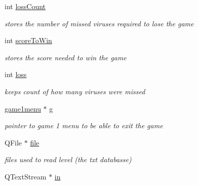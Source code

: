 \begin{DoxyCompactItemize}
\mbox{\label{classgame1scene_ade62ddcdc487fed3172557f475661207}} 
int \hyperlink{classgame1scene_ade62ddcdc487fed3172557f475661207}{loss\+Count}
\begin{DoxyCompactList}\small\item\em stores the number of missed viruses required to lose the game \end{DoxyCompactList}\item 
\mbox{\label{classgame1scene_a2ddd7dd6961d74ed938a9a924bf0063d}} 
int \hyperlink{classgame1scene_a2ddd7dd6961d74ed938a9a924bf0063d}{score\+To\+Win}
\begin{DoxyCompactList}\small\item\em stores the score needed to win the game \end{DoxyCompactList}\item 
\mbox{\label{classgame1scene_aab5556912872e7d31c72a911a7443244}} 
int \hyperlink{classgame1scene_aab5556912872e7d31c72a911a7443244}{loss}
\begin{DoxyCompactList}\small\item\em keeps count of how many viruses were missed \end{DoxyCompactList}\item 
\mbox{\label{classgame1scene_ad71ee5af83ebf44269c1985d300aa104}} 
\hyperlink{classgame1menu}{game1menu} $\ast$ \hyperlink{classgame1scene_ad71ee5af83ebf44269c1985d300aa104}{g}
\begin{DoxyCompactList}\small\item\em pointer to game 1 menu to be able to exit the game \end{DoxyCompactList}\item 
\mbox{\label{classgame1scene_a0b20d7d61cf85c7928d181d379744219}} 
Q\+File $\ast$ \hyperlink{classgame1scene_a0b20d7d61cf85c7928d181d379744219}{file}
\begin{DoxyCompactList}\small\item\em files used to read level (the txt databasse) \end{DoxyCompactList}\item 
\mbox{\label{classgame1scene_ad5e40df47bf0f8559d640167a7137470}} 
Q\+Text\+Stream $\ast$ \hyperlink{classgame1scene_ad5e40df47bf0f8559d640167a7137470}{in}

\end{DoxyCompactItemize}
